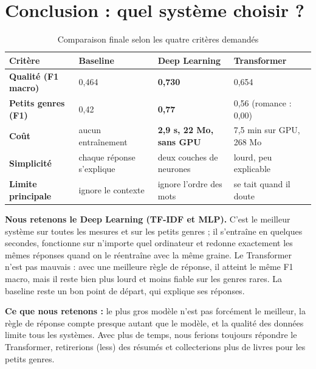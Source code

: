 \documentclass[11pt,a4paper]{article}
\begin{document}
\section{Conclusion : quel système choisir ?}

\begin{table}[htbp]
\centering
\caption{Comparaison finale selon les quatre critères demandés}
\label{tab:choix}
\small
\begin{tabularx}{\textwidth}{>{\raggedright\bfseries\arraybackslash}p{3.5cm} Y Y Y}
\toprule
\textbf{Critère} & \textbf{Baseline} & \textbf{Deep Learning} & \textbf{Transformer} \\
\midrule
Qualité (F1 macro) & 0,464 & \textbf{0,730} & 0,654 \\
Petits genres (F1) & 0,42 & \textbf{0,77} & 0,56 (romance : 0,00) \\
Coût & aucun entraînement & \textbf{2,9 s, 22 Mo, sans GPU} & 7,5 min sur GPU, 268 Mo \\
Simplicité & chaque réponse s'explique & deux couches de neurones & lourd, peu explicable \\
Limite principale & ignore le contexte & ignore l'ordre des mots & se tait quand il doute \\
\bottomrule
\end{tabularx}
\end{table}

\textbf{Nous retenons le Deep Learning (TF-IDF et MLP).} C'est le meilleur système sur toutes les mesures et sur les petits genres ; il s'entraîne en quelques secondes, fonctionne sur n'importe quel ordinateur et redonne exactement les mêmes réponses quand on le réentraîne avec la même graine. Le Transformer n'est pas mauvais : avec une meilleure règle de réponse, il atteint le même F1 macro, mais il reste bien plus lourd et moins fiable sur les genres rares. La baseline reste un bon point de départ, qui explique ses réponses.

\textbf{Ce que nous retenons :} le plus gros modèle n'est pas forcément le meilleur, la règle de réponse compte presque autant que le modèle, et la qualité des données limite tous les systèmes. Avec plus de temps, nous ferions toujours répondre le Transformer, retirerions \og (less) \fg{} des résumés et collecterions plus de livres pour les petits genres.

\newpage
\end{document}
